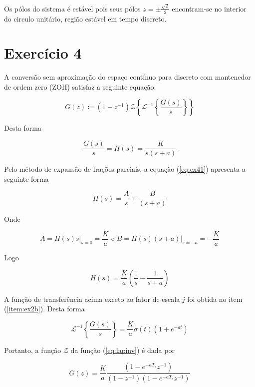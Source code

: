 \documentclass{article}
\begin{document}
Os pólos do sistema é estável pois seus pólos $z = \pm\frac{\sqrt{2}}{2}$ encontram-se no interior do circulo unitário, região estável em tempo discreto.

\section*{Exercício 4}

A conversão sem aproximação do espaço contínuo para discreto com mantenedor de ordem zero (ZOH) satisfaz a seguinte equação:

\begin{equation}
G(z) \coloneqq (1-z^{-1}) \mathcal{Z}\left\{\mathcal{L}^{-1}\left\{\frac{G(s)}{s}\right\}\right\}
\end{equation}

Desta forma

\begin{equation}
\label{eq:ex41}
\frac{G(s)}{s} = H(s) = \frac{K}{s(s+a)}
\end{equation}

Pelo método de expansão de frações parciais, a equação (\ref{eq:ex41}) apresenta a seguinte forma

\begin{equation}
H(s) = \frac{A}{s} + \frac{B}{(s+a)} 
\end{equation}

Onde 

\begin{equation}
A = H(s) s \bigg\rvert_{s=0} = \frac{K}{a} \mbox{ e } B = H(s) (s+a)\bigg\rvert_{s=-a} = -\frac{K}{a}
\end{equation}

Logo

\begin{equation}
H(s) = \frac{K}{a} \left( \frac{1}{s} - \frac{1}{s+a} \right)
\end{equation}

A função de transferência acima exceto ao fator de escala $j$ foi obtida no item (\ref{item:ex2b}). Desta forma

\begin{equation}
\label{eq:lapinv}
\mathcal{L}^{-1}\left\{\frac{G(s)}{s}\right\} = \frac{K}{a}\sigma(t)\left(1+e^{-at}\right)
\end{equation}

Portanto, a função $\mathcal{Z}$ da função (\ref{eq:lapinv}) é dada por

\begin{equation}
G(z) = \frac{K}{a} \frac{(1 - e^{-aT_s}z^{-1})}{(1-z^{-1})(1 - e^{-aT_s}z^{-1})}
\end{equation}
\end{document}
